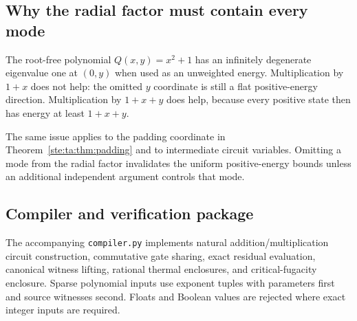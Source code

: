 \documentclass[11pt,letterpaper]{article}
\theoremstyle{definition}
\theoremstyle{remark}
\begin{document}
\subsection{Why the radial factor must contain every mode}
The root-free polynomial $Q(x,y)=x^2+1$ has an infinitely degenerate eigenvalue one at $(0,y)$ when used as an unweighted energy. Multiplication by $1+x$ does not help: the omitted $y$ coordinate is still a flat positive-energy direction. Multiplication by $1+x+y$ does help, because every positive state then has energy at least $1+x+y$.

The same issue applies to the padding coordinate in Theorem~\ref{ste:ta:thm:padding} and to intermediate circuit variables. Omitting a mode from the radial factor invalidates the uniform positive-energy bounds unless an additional independent argument controls that mode.

\subsection{Compiler and verification package}\label{ste:ta:sec:package}
The accompanying \texttt{compiler.py} implements natural addition/multiplication circuit construction, commutative gate sharing, exact residual evaluation, canonical witness lifting, rational thermal enclosures, and critical-fugacity enclosure. Sparse polynomial inputs use exponent tuples with parameters first and source witnesses second. Floats and Boolean values are rejected where exact integer inputs are required.
\end{document}
